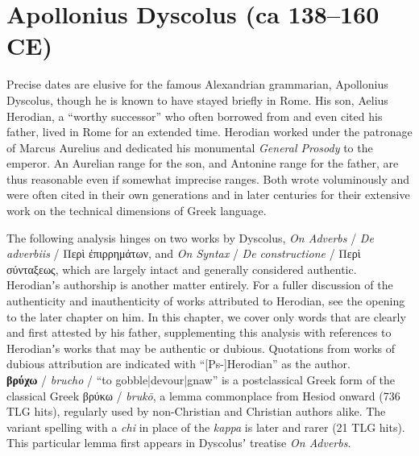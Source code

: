 %
%
\chapter{Apollonius Dyscolus (ca 138--160 CE)}%
\vspace*{3mm} %
\justifying %

\noindent{}Precise dates are elusive for the famous Alexandrian grammarian, Apollonius Dyscolus, %
though he is known to have stayed briefly in Rome. %
His son, Aelius Herodian, a “worthy successor” who often borrowed from and even cited his father, %
lived in Rome for an extended time. %
Herodian worked under the patronage of Marcus Aurelius %
and dedicated his monumental \textit{General Prosody} to the emperor. %
An Aurelian range for the son, and Antonine range for the father, %
are thus reasonable even if somewhat imprecise ranges. %
Both wrote voluminously and were often cited in their own generations and in later centuries %
for their extensive work on the technical dimensions of Greek language. %

The following analysis hinges on two works by Dyscolus, \textit{On Adverbs} / \textit{De adverbiis} / Περὶ ἐπιρρημάτων, %
and \textit{On Syntax} / \textit{De constructione} / Περὶ σύνταξεως, %
which are largely intact and generally considered authentic. %
Herodianʼs authorship is another matter entirely. %
For a fuller discussion of the authenticity and inauthenticity of works %
attributed to Herodian, see the opening to the later chapter on him. %
In this chapter, we cover only words that are clearly and first attested by his father, %
supplementing this analysis with references to Herodianʼs works that may be authentic or dubious. %
Quotations from works of dubious attribution are indicated with “[Ps-]Herodian” as the author. \\[2mm] %

\noindent{}\textbf{βρύχω} / \textit{brucho} / “to gobble|devour|gnaw” is a postclassical %
Greek form of the classical Greek βρύκω / \textit{brukō}, a lemma commonplace from Hesiod onward (736 TLG hits), %
regularly used by non-Christian and Christian authors alike. %
The variant spelling with a \textit{chi} in place of the \textit{kappa} is later and rarer (21 TLG hits). %
This particular lemma first appears in Dyscolusʼ treatise \textit{On Adverbs}. 

